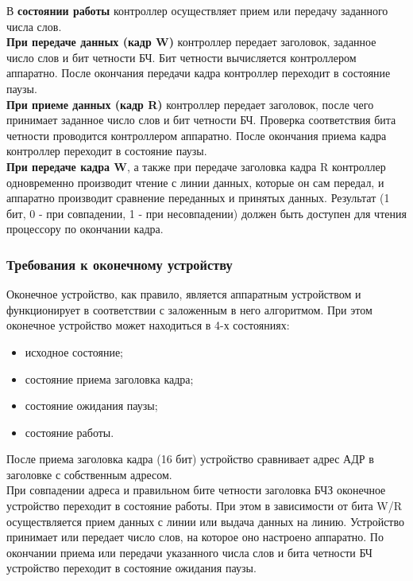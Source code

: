 		В \textbf{состоянии работы} контроллер осуществляет прием или передачу заданного числа слов. \\
		
		\textbf{При передаче данных (кадр W)} контроллер передает заголовок, заданное число слов и бит четности БЧ. Бит четности вычисляется контроллером аппаратно. После окончания передачи кадра контроллер переходит в состояние паузы. \\
		
		\textbf{При приеме данных (кадр R)} контроллер передает заголовок, после чего принимает заданное число слов и бит четности БЧ. Проверка соответствия бита четности проводится контроллером аппаратно. После окончания приема кадра контроллер переходит в состояние паузы. \\
		
		\textbf{При передаче кадра W}, а также при передаче заголовка кадра R контроллер одновременно производит чтение с линии данных, которые он сам передал, и аппаратно производит сравнение переданных и принятых данных. Результат (1 бит,  0 - при совпадении, 1 - при несовпадении) должен быть доступен для чтения процессору по окончании кадра.
		
		\subsubsection{Требования к оконечному устройству}
		Оконечное устройство, как правило, является аппаратным устройством и функционирует в соответствии с заложенным в него алгоритмом. При этом оконечное устройство может находиться в 4-х состояниях:
		\begin{itemize}
			\item  исходное состояние;
			\item  состояние приема заголовка кадра;
			\item  состояние ожидания паузы;
			\item  состояние работы. \\
		\end{itemize}
	
		После приема заголовка кадра (16 бит) устройство сравнивает адрес АДР в заголовке с собственным адресом.\\
		
		При совпадении адреса и правильном бите четности заголовка БЧЗ оконечное устройство переходит в состояние работы. При этом в зависимости от бита W/R осуществляется прием данных с линии или выдача данных на линию. Устройство принимает или передает число слов, на которое оно настроено аппаратно. По окончании приема или передачи указанного числа слов и бита четности БЧ устройство переходит в состояние ожидания паузы. \\
		
